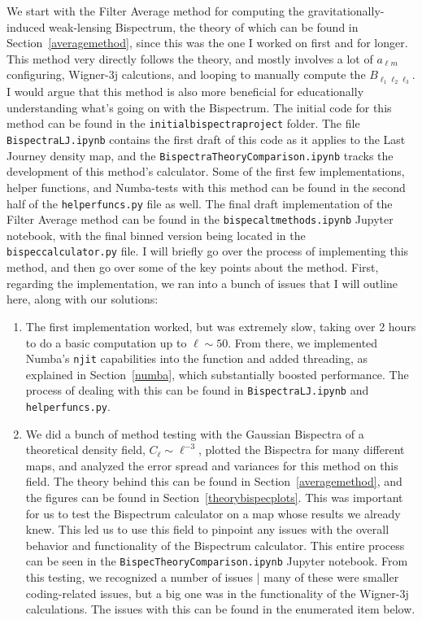 \documentclass[11pt]{article}
\renewcommand{\_}[1]{\underline{ #1 }}
\newcommand{\npar}{\vspace{.3cm}\newline}
\newcommand{\us}{\textunderscore}
\begin{document}
{We start with the Filter Average method for computing the gravitationally-induced weak-lensing Bispectrum, the theory of which can be found in Section~\ref{averagemethod}, since this was the one I worked on first and for longer. This method very directly follows the theory, and mostly involves a lot of $a_{\ell m}$ configuring, Wigner-3j calcutions, and looping to manually compute the $B_{\ell_1 \ell_2 \ell_3}$. I would argue that this method is also more beneficial for educationally understanding what's going on with the Bispectrum.
\npar
The initial code for this method can be found in the \texttt{initial\us bispectra\us project} folder. The file \texttt{Bispectra\us LJ.ipynb} contains the first draft of this code as it applies to the Last Journey density map, and the \texttt{Bispectra\us Theory\us Comparison.ipynb} tracks the development of this method's calculator. Some of the first few implementations, helper functions, and Numba-tests with this method can be found in the second half of the \texttt{helper\us funcs.py} file as well. The final draft implementation of the Filter Average method can be found in the \texttt{bispec\us alt\us methods.ipynb} Jupyter notebook, with the final binned version being located in the \texttt{bispec\us calculator.py} file.
\npar
I will briefly go over the process of implementing this method, and then go over some of the key points about the method. First, regarding the implementation, we ran into a bunch of issues that I will outline here, along with our solutions:
\begin{enumerate}
    \item The first implementation worked, but was extremely slow, taking over 2 hours to do a basic computation up to $\ell \sim 50$. From there, we implemented Numba's \texttt{njit} capabilities into the function and added threading, as explained in Section~\ref{numba}, which substantially boosted performance. The process of dealing with this can be found in \texttt{Bispectra\us LJ.ipynb} and \texttt{helper\us funcs.py}.
    \item We did a bunch of method testing with the Gaussian Bispectra of a theoretical density field, $C_{\ell} \sim \ell^{-3}$, plotted the Bispectra for many different maps, and analyzed the error spread and variances for this method on this field. The theory behind this can be found in Section~\ref{averagemethod}, and the figures can be found in Section~\ref{theorybispecplots}. This was important for us to test the Bispectrum calculator on a map whose results we already knew. This led us to use this field to pinpoint any issues with the overall behavior and functionality of the Bispectrum calculator. This entire process can be seen in the \texttt{Bispec\us Theory\us Comparison.ipynb} Jupyter notebook. From this testing, we recognized a number of issues | many of these were smaller coding-related issues, but a big one was in the functionality of the Wigner-3j calculations. The issues with this can be found in the enumerated item below.

\end{enumerate}}
\end{document}
